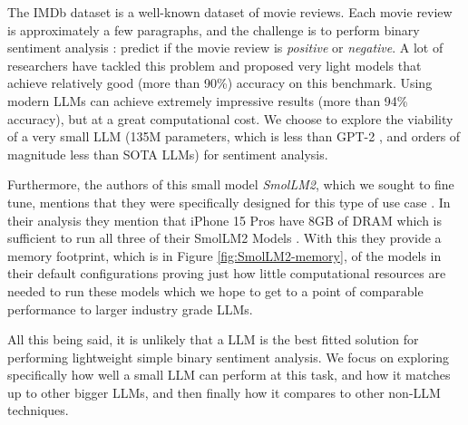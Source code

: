\documentclass[10pt,twocolumn,letterpaper]{article}
\begin{document}
The IMDb dataset is a well-known dataset of movie reviews. Each movie review is approximately a few paragraphs, and the challenge is to perform binary sentiment analysis : predict if the movie review is \textit{positive} or \textit{negative}. A lot of researchers have tackled this problem and proposed very light models that achieve relatively good (more than 90\%) accuracy on this benchmark. Using modern LLMs can achieve extremely impressive results (more than 94\% accuracy), but at a great computational cost. We choose to explore the viability of a very small LLM (135M parameters, which is less than GPT-2 \cite{radford2019language}, and orders of magnitude less than SOTA LLMs) for sentiment analysis.

Furthermore, the authors of this small model \textit{SmolLM2}, which we sought to fine tune, mentions that they were specifically designed for this type of use case \cite{hf-SmolLM-usecase}. In their analysis they mention that iPhone 15 Pros have 8GB of DRAM which is sufficient to run all three of their SmolLM2 Models \cite{hf-SmolLM2-collection}. With this they provide a memory footprint, which is in Figure \ref{fig:SmolLM2-memory}, of the models in their default configurations proving just how little computational resources are needed to run these models which we hope to get to a point of comparable performance to larger industry grade LLMs.

All this being said, it is unlikely that a LLM is the best fitted solution for performing lightweight simple binary sentiment analysis. We focus on exploring specifically how well a small LLM can perform at this task, and how it matches up to other bigger LLMs, and then finally how it compares to other non-LLM techniques.
\end{document}
